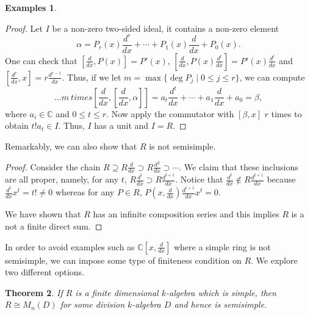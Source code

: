 \documentclass{tufte-handout} %
\newtheorem{thm}{Theorem}
\theoremstyle{definition}
\newtheorem{exmps}[thm]{Examples}
\theoremstyle{remark}
\renewcommand{\C}{\mathbb{C}}
\begin{document}
\begin{exmps}
\begin{enumerate}
		\begin{proof}
			Let $I$ be a non-zero two-sided ideal, it contains a non-zero element 
			\[\alpha = P_r(x)\frac{d^r}{dx} + \cdots + P_1(x)\frac{d}{dx} + P_0(x).\]
			One can check that $[\frac{d}{dx}, P(x)] = P'(x)$, $[\frac{d}{dx}, P(x)\frac{d^t}{dx}] = P'(x)\frac{d^t}{dx}$ and $[\frac{d^r}{dx}, x] = r \frac{d^{r-1}}{dx}$. Thus, if we let $m = \max\{\deg P_j \mid 0\leq j \leq r\}$, we can compute 
			\[... m\ times[\frac{d}{dx},[\frac{d}{dx}, \alpha]] = a_t\frac{d^t}{dx} + \cdots + a_1 \frac{d}{dx} + a_0 = \beta,\]
			where $a_i \in \C$ and $0\leq t \leq r$. Now apply the commutator with $[\beta, x]$ $r$ times to obtain $t!a_t \in I$. Thus, $I$ has a unit and $I = R$. %
		\end{proof}
		Remarkably, we can also show that $R$ is not semisimple.
		\begin{proof}
			Consider the chain $R \supseteq R\frac{d}{dx} \supset R\frac{d^2}{dx} \supset \cdots$. We claim that these inclusions are all proper, namely, for any $t$, $R\frac{d^t}{dx} \supset R\frac{d^{t+1}}{dx}$. Notice that $\frac{d^t}{dx} \notin R\frac{d^{t+1}}{dx}$ because $\frac{d^t}{dx}x^t = t! \neq 0$ whereas for any $P \in R$, $P(x,\frac{d}{dx})\frac{d^{t+1}}{dx}x^t = 0$.
			
			We have shown that $R$ has an infinite composition series and this implies $R$ is a not a finite direct sum. %
		\end{proof}
	\end{enumerate}
\end{exmps}
In order to avoid examples such as $\C[x,\frac{d}{dx}]$ where a simple ring is not semisimple, we can impose some type of finiteness condition on $R$. We explore two different options.
\begin{thm}\label{findimalgsemi}
	If $R$ is a finite dimensional $k$-algebra which is simple, then $R \cong M_n(D)$ for some division $k$-algebra $D$ and hence is semisimple.
\end{thm}
\end{document}
